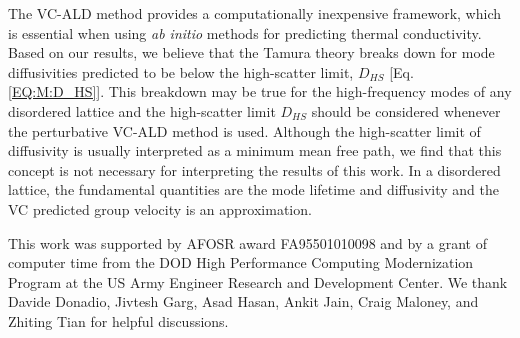 \documentclass[aps,prb,onecolumn,preprint,footinbib,superscriptaddress,amsmath,amssymb,floatfix]{revtex4}
\begin{document}
The VC-ALD method provides a computationally inexpensive framework, 
which is 
essential when using \emph{ab initio} 
methods for predicting thermal conductivity.
\cite{ward_intrinsic_2010,lindsay_thermal_2012,garg_role_2011,shiga_microscopic_2012,tian_phonon_2012,shiomi_thermal_2011,esfarjani_heat_2011,li_thermal_2012,luckyanova_coherent_2012} Based on our results, 
we believe that the Tamura theory breaks down for mode  
diffusivities predicted to be below the high-scatter limit, $D_{HS}$ 
[Eq. \eqref{EQ:M:D_HS}]. 
This breakdown may be true for the high-frequency modes of any 
disordered lattice\cite{sheng_heat_1991} 
and the high-scatter limit $D_{HS}$ should be 
considered whenever the perturbative VC-ALD method is used.
Although the high-scatter limit of 
diffusivity is usually interpreted as a minimum mean free path,
\cite{kittel_interpretation_1949,graebner_phonon_1986,cahill_lattice_1988,sheng_heat_1991} 
we find that this concept is not necessary for interpreting the results 
of this work. In a disordered lattice, the fundamental quantities are 
the mode lifetime and diffusivity\cite{sheng_heat_1991,allen_thermal_1993,allen_diffusons_1999,taraskin_determination_1999,xu_energy_2009,vitelli_heat_2010,beltukov_ioffe_2013} and the 
VC predicted group velocity is an approximation.

\begin{acknowledgements}
This work was supported by AFOSR award FA95501010098 and by a grant 
of computer time from the DOD 
High Performance Computing Modernization Program at the US Army Engineer 
Research and Development Center. 
We thank Davide Donadio, Jivtesh Garg, Asad Hasan, Ankit Jain, Craig Maloney, 
and Zhiting Tian for helpful discussions.
\end{acknowledgements}

\appendix
\end{document}
